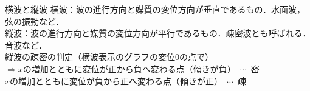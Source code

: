 \begin{matome}{横波と縦波}
 \hspace{3mm} 横波：波の進行方向と媒質の変位方向が垂直であるもの．水面波，弦の振動など．\\
\hspace{3mm} 縦波：波の進行方向と媒質の変位方向が平行であるもの．疎密波とも呼ばれる．音波など．\\[1mm]
\hspace{3mm} 縦波の疎密の判定（横波表示のグラフの変位$0$の点で）\\
\hspace{5mm} $\Rightarrow$\quad{}$x$の増加とともに変位が正から負へ変わる点（傾きが負）\ $\cdots$\ {\gtfamily 密}\\
\hspace{5mm} \phantom{$\Rightarrow$}\quad{}$x$の増加とともに変位が負から正へ変わる点（傾きが正）\ $\cdots$\ {\gtfamily 疎}
 \end{matome}

